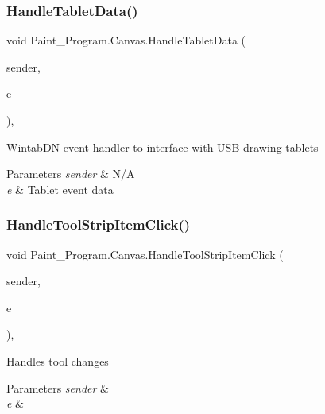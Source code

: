 \subsubsection{\texorpdfstring{Handle\+Tablet\+Data()}{HandleTabletData()}}
{\footnotesize\ttfamily void Paint\+\_\+\+Program.\+Canvas.\+Handle\+Tablet\+Data (\begin{DoxyParamCaption}\item[{object}]{sender,  }\item[{\mbox{\hyperlink{class_wintab_d_n_1_1_message_received_event_args}{Message\+Received\+Event\+Args}}}]{e }\end{DoxyParamCaption})\hspace{0.3cm}{\ttfamily [inline]}, {\ttfamily [private]}}



\mbox{\hyperlink{namespace_wintab_d_n}{Wintab\+DN}} event handler to interface with U\+SB drawing tablets 


\begin{DoxyParams}{Parameters}
{\em sender} & N/A\\
\hline
{\em e} & Tablet event data\\
\hline
\end{DoxyParams}
\mbox{\label{class_paint___program_1_1_canvas_a2b9769c074033d3e7b9782f058adac34}} 
\subsubsection{\texorpdfstring{Handle\+Tool\+Strip\+Item\+Click()}{HandleToolStripItemClick()}}
{\footnotesize\ttfamily void Paint\+\_\+\+Program.\+Canvas.\+Handle\+Tool\+Strip\+Item\+Click (\begin{DoxyParamCaption}\item[{object}]{sender,  }\item[{Event\+Args}]{e }\end{DoxyParamCaption})\hspace{0.3cm}{\ttfamily [inline]}, {\ttfamily [private]}}



Handles tool changes 


\begin{DoxyParams}{Parameters}
{\em sender} & \\
\hline
{\em e} & \\
\hline
\end{DoxyParams}
\mbox{\label{class_paint___program_1_1_canvas_a94533b18db7d150d723ecaaf789d406b}} 
